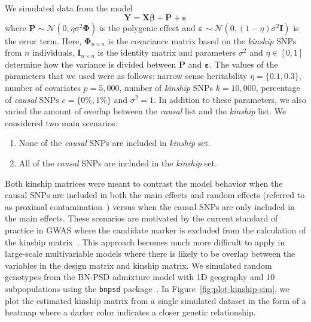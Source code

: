 \documentclass[12pt,letter]{article}\usepackage[]{graphicx}\usepackage[]{color}
\newcommand{\bX}{\textbf{X}}
\newcommand{\bY}{\textbf{Y}}
\newcommand{\bI}{\textbf{I}}
\newcommand{\be}{\boldsymbol{\varepsilon}}
\newcommand{\bbeta}{\boldsymbol{\beta}}
\newcommand{\bPhi}{\boldsymbol{\Phi}}
\begin{document}
We simulated data from the model
\begin{equation}
\bY = \bX \bbeta + \mathbf{P} + \be
\end{equation}
where $\mathbf{P}\sim \mathcal{N}(0, \eta \sigma^2 \bPhi)$ is the polygenic effect and $\be \sim \mathcal{N}(0, (1-\eta) \sigma^2 \bI)$ is the error term. Here, $\bPhi_{n \times n}$ is the covariance matrix based on the \textit{kinship} SNPs from $n$ individuals, $\bI_{n \times n}$ is the identity matrix and parameters $\sigma^2$ and $\eta \in [0,1]$ determine how the variance is divided between $\mathbf{P}$ and $\be$. The values of the parameters that we used were as follows: narrow sense heritability $\eta=\lbrace 0.1, 0.3 \rbrace$, number of covariates $p = 5,000$, number of \textit{kinship} SNPs $k = 10,000$, percentage of \textit{causal} SNPs $c=\lbrace 0\%, 1\%\rbrace$ and $\sigma^2 = 1$. In addition to these parameters, we also varied the amount of overlap between the \textit{causal} list and the \textit{kinship} list. We considered two main scenarios:

\begin{enumerate}
	\item None of the \textit{causal} SNPs are included in \textit{kinship} set.
	\item All of the \textit{causal} SNPs are included in the \textit{kinship} set.
\end{enumerate}

Both kinship matrices were meant to contrast the model behavior when the causal SNPs are included in both the main effects and random effects (referred to as proximal contamination~\citep{lippert2011fast}) versus when the causal SNPs are only included in the main effects. These scenarios are motivated by the current standard of practice in GWAS where the candidate marker is excluded from the calculation of the kinship matrix~\citep{lippert2011fast}. This approach becomes much more difficult to apply in large-scale multivariable models where there is likely to be overlap between the variables in the design matrix and kinship matrix. We simulated random genotypes from the BN-PSD admixture model with 1D geography and 10 subpopulations using the \texttt{bnpsd} package~\citep{bnpsd1,bnpsd2}. In Figure~\ref{fig:plot-kinship-sim}, we plot the estimated kinship matrix from a single simulated dataset in the form of a heatmap where a darker color indicates a closer genetic relationship. 
\end{document}
